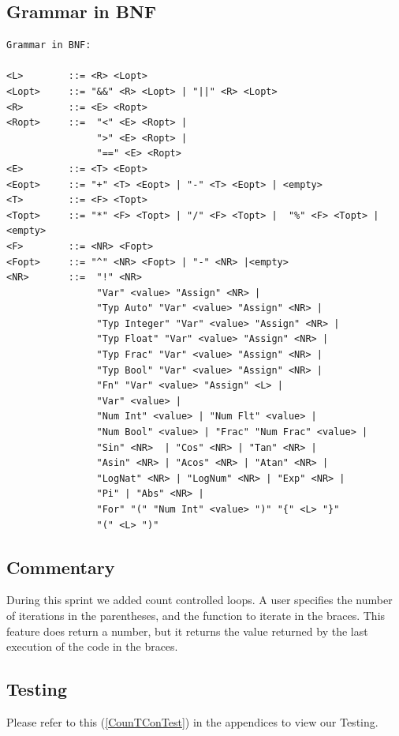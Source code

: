 \documentclass[a4paper, oneside, 11pt]{report}
\begin{document}
\subsection{Grammar in BNF}
\begin{verbatim}
Grammar in BNF:

<L>        ::= <R> <Lopt>
<Lopt>     ::= "&&" <R> <Lopt> | "||" <R> <Lopt> 
<R>        ::= <E> <Ropt>
<Ropt>     ::=  "<" <E> <Ropt> | 
                ">" <E> <Ropt> |  
                "==" <E> <Ropt>
<E>        ::= <T> <Eopt>
<Eopt>     ::= "+" <T> <Eopt> | "-" <T> <Eopt> | <empty>
<T>        ::= <F> <Topt>
<Topt>     ::= "*" <F> <Topt> | "/" <F> <Topt> |  "%" <F> <Topt> |<empty>
<F>        ::= <NR> <Fopt>
<Fopt>     ::= "^" <NR> <Fopt> | "-" <NR> |<empty> 
<NR>       ::=  "!" <NR>
                "Var" <value> "Assign" <NR> |
                "Typ Auto" "Var" <value> "Assign" <NR> |
                "Typ Integer" "Var" <value> "Assign" <NR> |
                "Typ Float" "Var" <value> "Assign" <NR> |
                "Typ Frac" "Var" <value> "Assign" <NR> |
                "Typ Bool" "Var" <value> "Assign" <NR> |
                "Fn" "Var" <value> "Assign" <L> |
                "Var" <value> |
                "Num Int" <value> | "Num Flt" <value> |
                "Num Bool" <value> | "Frac" "Num Frac" <value> |
                "Sin" <NR>  | "Cos" <NR> | "Tan" <NR> |
                "Asin" <NR> | "Acos" <NR> | "Atan" <NR> |
                "LogNat" <NR> | "LogNum" <NR> | "Exp" <NR> |
                "Pi" | "Abs" <NR> |
                "For" "(" "Num Int" <value> ")" "{" <L> "}"
                "(" <L> ")"
\end{verbatim}
\subsection{Commentary}
During this sprint we added count controlled loops. A user specifies the number of iterations in the parentheses, and the function to iterate in the braces. This feature does return a number, but it returns the value returned by the last execution of the code in the braces. 

\subsection{Testing}
Please refer to this (\ref{CounTConTest}) in the appendices to view our Testing. \\


\clearpage
 
\end{document}

